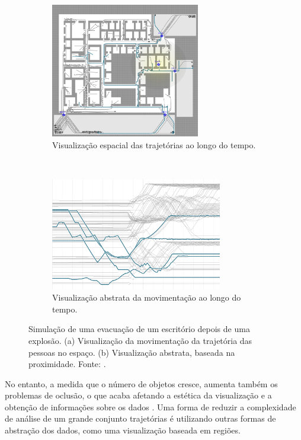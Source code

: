 \begin{description}
\begin{figure}[ht!]
  \centering
  \begin{subfigure}[t]{0.45\textwidth}
    \centering
    \includegraphics[width=65mm]{../figuras/proximidade-espacial.png}
    \caption{Visualização espacial das trajetórias ao longo do tempo. \label{fig:viz-espacial}}
  \end{subfigure}
  ~
  \begin{subfigure}[t]{0.45\textwidth}
    \centering
    \includegraphics[width=75mm]{../figuras/proximidade-abstrata.png}
    \caption{Visualização abstrata da movimentação ao longo do tempo. \label{fig:viz-abstrata}}
  \end{subfigure}

  \caption[Visualização espacial vs abstrata da movimentação de pessoas em um
escritório]{Simulação de uma evacuação de um escritório depois de uma explosão.
(a) Visualização da movimentação da trajetória das pessoas no espaço. (b)
Visualização abstrata, baseada na proximidade.  Fonte: \citet{Tarik2009}.
\label{fig:tarik}}
\end{figure}


  No entanto, a medida que o número de objetos cresce, aumenta também os
problemas de oclusão, o que acaba afetando a estética da visualização e a
obtenção de informações sobre os dados \citep{Zhou2013}. Uma forma de reduzir
a complexidade de análise de um grande conjunto  trajetórias é utilizando
outras formas de abstração dos dados, como uma visualização baseada em regiões.


\end{description}
